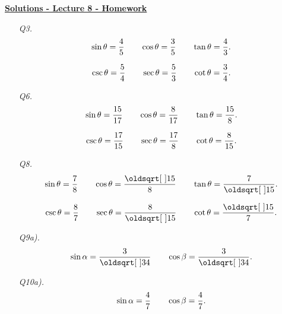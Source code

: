 \documentclass[12pt]{article} %
\theoremstyle{ex}
\begin{document}
\begin{center}
		\Huge{\underline{\textbf{Solutions - Lecture 8 - Homework}}}
\end{center}
\begin{qstn} \text{ }
  \begin{itemize} 
    \item[\textit{Q3.}]
      \[
          \sin \theta = \frac{4}{5} \hspace{0.7cm} \cos \theta = \frac{3}{5} \hspace{0.7cm} \tan \theta =
          \frac{4}{3}
      .\] 

      \[
          \csc \theta = \frac{5}{4} \hspace{0.7cm} \sec \theta = \frac{5}{3} \hspace{0.7cm} \cot \theta =
          \frac{3}{4}
      .\] 

    \item[\textit{Q6.}]
      \[
          \sin \theta = \frac{15}{17} \hspace{0.7cm} \cos \theta = \frac{8}{17} \hspace{0.7cm} \tan \theta =
          \frac{15}{8}
      .\] 

      \[
          \csc \theta = \frac{17}{15} \hspace{0.7cm} \sec \theta = \frac{17}{8} \hspace{0.7cm} \cot \theta =
          \frac{8}{15}
      .\] 

    \item[\textit{Q8.}]
      \[
          \sin \theta = \frac{7}{8} \hspace{0.7cm} \cos \theta = \frac{\sqrt{15}}{8} \hspace{0.7cm} \tan \theta =
          \frac{7}{\sqrt{15}}
      .\] 

      \[
          \csc \theta = \frac{8}{7} \hspace{0.7cm} \sec \theta = \frac{8}{\sqrt{15}} \hspace{0.7cm} \cot \theta =
          \frac{\sqrt{15}}{7}
      .\] 
  \end{itemize}
\end{qstn}

\begin{qstn} \text{ }
  \begin{itemize} 
    \item[\textit{Q9a).}]
      \[
          \sin \alpha = \frac{3}{\sqrt{34}} \hspace{0.7cm} \cos \beta = \frac{3}{\sqrt{34}}
      .\] 

    \item[\textit{Q10a).}]
      \[
          \sin \alpha = \frac{4}{7} \hspace{0.7cm} \cos \beta = \frac{4}{7}
      .\] 
  \end{itemize}
\end{qstn}
\end{document}
